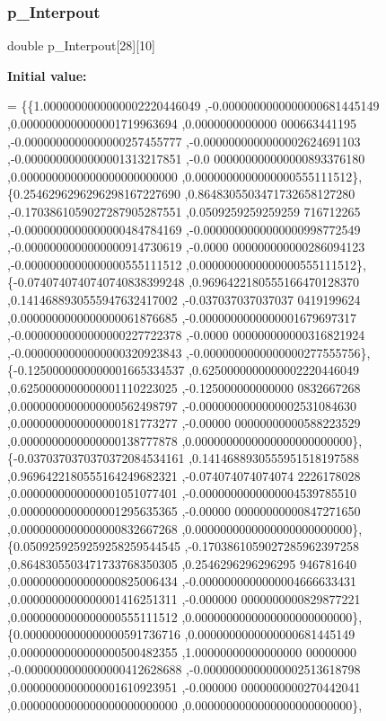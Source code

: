 \subsubsection{\texorpdfstring{p\+\_\+\+Interpout}{p\_Interpout}}
{\footnotesize\ttfamily double p\+\_\+\+Interpout\mbox{[}28\mbox{]}\mbox{[}10\mbox{]}}

{\bfseries Initial value\+:}
\begin{DoxyCode}
= \{\{1.0000000000000002220446049 ,-0.0000000000000000681445149 ,0.0000000000000001719963694 ,0.0000000000000
      000663441195 ,-0.0000000000000000257455777 ,-0.0000000000000002624691103 ,-0.0000000000000001313217851 ,-0.0
      000000000000000893376180 ,0.0000000000000000000000000 ,0.0000000000000000555111512\},
\{0.2546296296296298167227690 ,0.8648305503471732658127280 ,-0.1703861059027287905287551 ,0.0509259259259259
      716712265 ,-0.0000000000000000484784169 ,-0.0000000000000000998772549 ,-0.0000000000000000914730619 ,-0.0000
      000000000000286094123 ,-0.0000000000000000555111512 ,0.0000000000000000555111512\},
\{-0.0740740740740740838399248 ,0.9696422180555166470128370 ,0.1414688930555947632417002 ,-0.037037037037037
      0419199624 ,0.0000000000000000061876685 ,-0.0000000000000001679697317 ,-0.0000000000000000227722378 ,-0.0000
      000000000000316821924 ,-0.0000000000000000320923843 ,-0.0000000000000000277555756\},
\{-0.1250000000000001665334537 ,0.6250000000000002220446049 ,0.6250000000000001110223025 ,-0.125000000000000
      0832667268 ,0.0000000000000000562498797 ,-0.0000000000000002531084630 ,0.0000000000000000181773277 ,-0.00000
      00000000000588223529 ,0.0000000000000000138777878 ,0.0000000000000000000000000\},
\{-0.0370370370370372084534161 ,0.1414688930555951518197588 ,0.9696422180555164249682321 ,-0.074074074074074
      2226178028 ,0.0000000000000001051077401 ,-0.0000000000000004539785510 ,0.0000000000000001295635365 ,-0.00000
      00000000000847271650 ,0.0000000000000000832667268 ,0.0000000000000000000000000\},
\{0.0509259259259258259544545 ,-0.1703861059027285962397258 ,0.8648305503471733768350305 ,0.2546296296296295
      946781640 ,0.0000000000000000825006434 ,-0.0000000000000004666633431 ,0.0000000000000001416251311 ,-0.000000
      0000000000829877221 ,0.0000000000000000555111512 ,0.0000000000000000000000000\},
\{0.0000000000000000591736716 ,0.0000000000000000681445149 ,0.0000000000000000500482355 ,1.00000000000000000
      00000000 ,-0.0000000000000000412628688 ,-0.0000000000000002513618798 ,0.0000000000000001610923951 ,-0.000000
      0000000000270442041 ,0.0000000000000000000000000 ,0.0000000000000000000000000\},

\end{DoxyCode}

